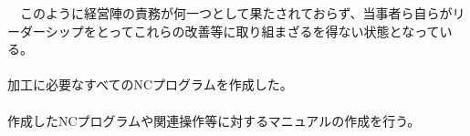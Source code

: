 {　このように経営陣の責務が何一つとして果たされておらず、当事者ら自らがリーダーシップをとってこれらの改善等に取り組まざるを得ない状態となっている。
}{%
\paragraph*{\tpartconclusion}
加工に必要なすべてのNCプログラムを作成した。
\tcbline*
\paragraph*{\tpartnextstep}
作成したNCプログラムや関連操作等に対するマニュアルの作成を行う。
}



\begin{appendices}
\Appendixpart

\end{appendices}
